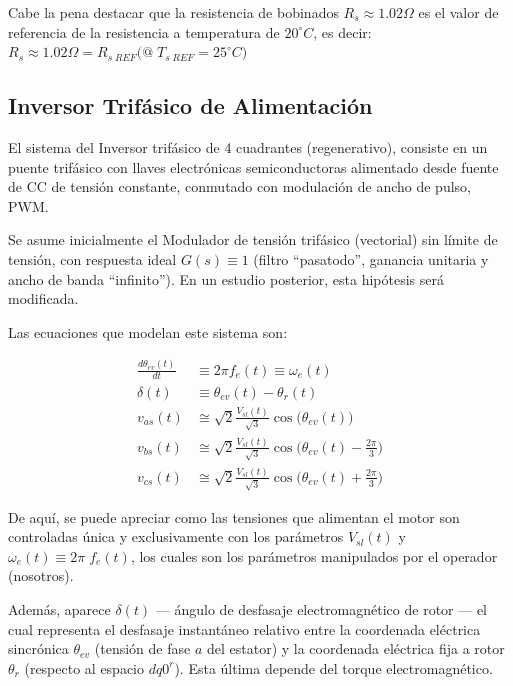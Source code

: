 \documentclass[blue,fullpaper]{ludusofficial}  %
\begin{document}
Cabe la pena destacar que la resistencia de bobinados $R_s \approx 1.02 \Omega$ es el valor de referencia de la resistencia a temperatura de $20^{\circ}C$, es decir: $R_s \approx 1.02 \Omega = R_{s \; REF} \Big( @ \; T_{s \; REF}=25^\circ C \Big)$

\subsection{Inversor Trifásico de Alimentación}
El sistema del Inversor trifásico de 4 cuadrantes (regenerativo), consiste en un puente trifásico con llaves electrónicas semiconductoras  alimentado desde fuente de CC de tensión constante, conmutado con modulación de ancho de pulso, PWM.

Se asume inicialmente el Modulador de tensión trifásico (vectorial) sin límite de tensión, con respuesta ideal $G(s) \equiv 1$ (filtro “pasatodo”, ganancia unitaria y ancho de banda “infinito”). En un estudio posterior, esta hipótesis será modificada.

Las ecuaciones que modelan este sistema son:

\begin{align}
    \frac{d\theta_{ev}(t)}{dt}  & \equiv 2\pi f_{e}(t) \equiv \omega_{e}(t) \\
    \delta(t)  & \equiv \theta_{ev}(t) - \theta_{r}(t) \\ 
    v_{as}(t)  & \cong \sqrt{ 2 } \frac{V_{sl}(t)}{\sqrt{ 3 }} \cos \Big( \theta_{ev}(t) \Big)  \\
    v_{bs}(t) &  \cong \sqrt{ 2 } \frac{V_{sl}(t)}{\sqrt{ 3 }} \cos \Big( \theta_{ev}(t) - \frac{2\pi}{3} \Big) \\
    v_{cs}(t) &  \cong \sqrt{ 2 } \frac{V_{sl}(t)}{\sqrt{ 3 }} \cos \Big( \theta_{ev}(t) + \frac{2\pi}{3}  \Big)
\end{align}

De aquí, se puede apreciar como las tensiones que alimentan el motor son controladas única y exclusivamente con los parámetros $V_{sl}(t)$ y $\omega_e(t)\equiv 2\pi \; f_e(t)$, los cuales son los parámetros manipulados por el operador (nosotros).

Además, aparece $\delta(t)$ — ángulo de desfasaje electromagnético de rotor — el cual representa el desfasaje instantáneo relativo entre la coordenada eléctrica sincrónica $\theta_{ev}$ (tensión de fase $a$ del estator) y la coordenada eléctrica fija a rotor $\theta_r$ (respecto al espacio $dq0^r$). Esta última depende del torque electromagnético.
\end{document}
